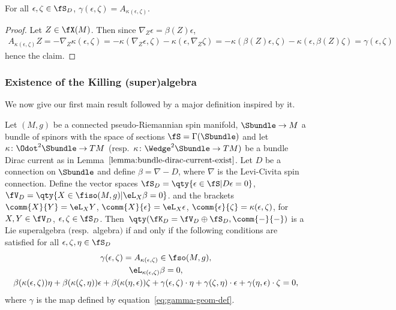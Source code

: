 \begin{Lemma}\label{lemma:dirac-current-endo}
	For all $\epsilon,\zeta\in\fS_D$, $\gamma(\epsilon,\zeta) = A_{\kappa(\epsilon,\zeta)}$.
\end{Lemma}

\begin{proof}
	Let $Z\in\fX(M)$. Then since $\nabla_Z\epsilon = \beta(Z)\epsilon$,
	\begin{gather*}
		A_{\kappa(\epsilon,\zeta)}Z
			= -\nabla_Z\kappa(\epsilon,\zeta)
			= - \kappa(\nabla_Z\epsilon,\zeta) - \kappa(\epsilon,\nabla_Z\zeta)= - \kappa(\beta(Z)\epsilon,\zeta) - \kappa(\epsilon,\beta(Z)\zeta)
			= \gamma(\epsilon,\zeta)
	\end{gather*}
	hence the claim.
\end{proof}

\subsubsection{Existence of the Killing (super)algebra}
\label{sec:exist-ksa}

We now give our first main result followed by a major definition inspired by it.

\begin{Theorem}\label{thm:killing-algebra-exist}
	Let $(M,g)$ be a connected pseudo-Riemannian spin manifold, $\Sbundle\to M$ a bundle of spinors with the space of sections $\fS=\Gamma(\Sbundle)$ and let $\kappa\colon \Odot^2\Sbundle\to TM$ {\rm(}resp.\ $\kappa\colon \Wedge^2\Sbundle\to TM)$ be a bundle Dirac current as in Lemma~$\ref{lemma:bundle-dirac-current-exist}$. Let $D$ be a connection on $\Sbundle$ and define $\beta=\nabla-D$, where $\nabla$ is the Levi-Civita spin connection. Define the vector spaces
$\fS_D = \qty{\epsilon\in\fS| D\epsilon = 0}$, $
		\fV_D = \qty{X\in\fiso(M,g)| \eL_X \beta = 0}$.
	and the brackets
$\comm{X}{Y} = \eL_X Y$,
$\comm{X}{\epsilon} = \eL_X \epsilon$,
$\comm{\epsilon}{\zeta} = \kappa(\epsilon,\zeta)$,
	for $X,Y\in\fV_D$, $\epsilon,\zeta\in\fS_D$. Then~${\qty(\fK_D =\fV_D\oplus\fS_D,\comm{-}{-})}$ is a Lie superalgebra $($resp.\ algebra$)$ if and only if the following conditions are satisfied for all $\epsilon,\zeta,\eta\in\fS_D$
	\begin{gather}
		\gamma(\epsilon,\zeta)=A_{\kappa(\epsilon,\zeta)}\in\fso(M,g),\label{eq:killing-alg-exist-1}\\
		\eL_{\kappa(\epsilon,\zeta)}\beta = 0,\label{eq:killing-alg-exist-2}\\
		\beta(\kappa(\epsilon,\zeta))\eta + \beta(\kappa(\zeta,\eta))\epsilon + \beta(\kappa(\eta,\epsilon))\zeta
		+ \gamma(\epsilon,\zeta)\cdot\eta + \gamma(\zeta,\eta)\cdot\epsilon +\gamma(\eta,\epsilon)\cdot\zeta
		= 0 \label{eq:killing-alg-exist-3},
	\end{gather}
	where $\gamma$ is the map defined by equation~\eqref{eq:gamma-geom-def}.
\end{Theorem}

